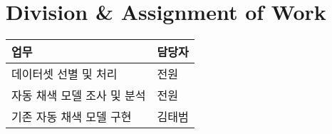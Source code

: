 \section{Division \& Assignment of Work}

\begin{table}[H]
	\centering
	\begin{tabular}{|l|l|}
		\toprule
		\textbf{업무} & \textbf{담당자} \\
		\toprule
		데이터셋 선별 및 처리 & 전원 \\
		자동 채색 모델 조사 및 분석 & 전원 \\
		기존 자동 채색 모델 구현 & 김태범 \\
		\bottomrule
	\end{tabular}
\end{table}